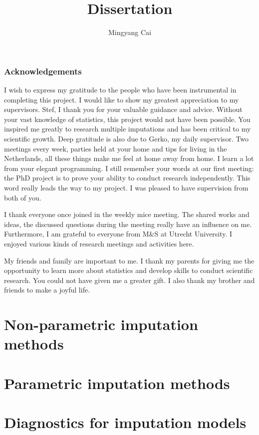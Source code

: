 \documentclass[12pt, fullpage, a4paper]{report}
\title{Dissertation}
\date{}
\author{Mingyang Cai}
\begin{document}
	\maketitle
	\section*{Acknowledgements}
	I wish to express my gratitude to the people who have been instrumental in completing this project. I would like to show my greatest appreciation to my supervisors. Stef, I thank you for your valuable guidance and advice. Without your vast knowledge of statistics, this project would not have been possible. You inspired me greatly to research multiple imputations and has been critical to my scientific growth. Deep gratitude is also due to Gerko, my daily supervisor. Two meetings every week, parties held at your home and tips for living in the Netherlands, all these things make me feel at home away from home. I learn a lot from your elegant programming. I still remember your words at our first meeting: the PhD project is to prove your ability to conduct research independently. This word really leads the way to my project. I was pleased to have supervision from both of you.
	
	I thank everyone once joined in the weekly mice meeting. The shared works and ideas, the discussed questions during the meeting really have an influence on me. Furthermore, I am grateful to everyone from M\&S at Utrecht University. I enjoyed various kinds of research meetings and activities here. 
	
	My friends and family are important to me. I thank my parents for giving me the opportunity to learn more about statistics and develop skills to conduct scientific research. You could not have given me a greater gift. I also thank my brother and friends to make a joyful life. 
	\tableofcontents
	\maketitle
	
	
	\part{Non-parametric imputation methods}
	
    
    \part{Parametric imputation methods}
    
    
    \part{Diagnostics for imputation models}
    
	
	\listoffigures
	\listoftables
\end{document}
